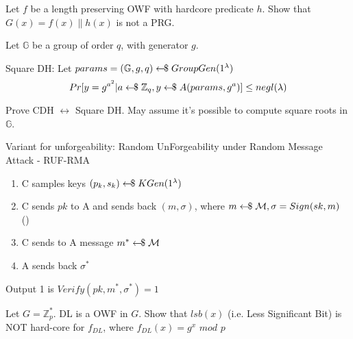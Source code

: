 \documentclass{exam}
\begin{document}
\begin{questions}
    \vspace{0.4cm}

    \question
        Let $f$ be a length preserving OWF with hardcore predicate $h$.\newline
        Show that $G(x) = f(x) \| h(x)$ is not a PRG.
    \vspace{0.4cm}

    \question
        Let $\mathbb{G}$ be a group of order $q$, with generator $g$.

        Square DH:\newline
        Let $params = (\mathbb{G},g,q) \leftarrow\kern-0.42em{\$} \; GroupGen(1^\lambda)$
        \[ Pr[y=g^{a^2} \vert a \leftarrow\kern-0.42em{\$} \; \mathbb{Z}_q, y \leftarrow\kern-0.42em{\$} \; A(params,g^a) ] \leq negl(\lambda) \]

        Prove CDH $\leftrightarrow$ Square DH. May assume it's possible to compute square roots in $\mathbb{G}$.
    \newpage

    \question
        Variant for unforgeability: Random UnForgeability under Random Message Attack - RUF-RMA

        \begin{enumerate}
            \item C samples keys $(p_k,s_k) \leftarrow\kern-0.42em{\$} \; KGen(1^\lambda)$
            \item C sends $pk$ to A and sends back $(m,\sigma)$, where $m \leftarrow\kern-0.42em{\$} \; \mathcal{M}, \sigma = Sign(sk,m)$ (\poly) 
            \item C sends to A message $m^* \leftarrow\kern-0.42em{\$} \; \mathcal{M}$
            \item A sends back $\sigma^*$
        \end{enumerate}
        Output 1 is $Verify(pk,m^*,\sigma^*) = 1$

    \vspace{0.4cm}
    
    \question
        Let $G = \mathbb{Z}_p^*$. DL is a OWF in $G$.\newline
        Show that $lsb(x)$ (i.e. Less Significant Bit) is NOT hard-core for $f_{DL}$, where $f_{DL}(x) = g^x$ $mod$ $p$

\end{questions}
\end{document}

